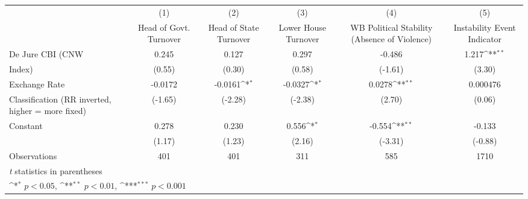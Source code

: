{
\def\sym#1{\ifmmode^{#1}\else\(^{#1}\)\fi}
\begin{tabular}{l*{5}{c}}
\hline\hline
                    &\multicolumn{1}{c}{(1)}&\multicolumn{1}{c}{(2)}&\multicolumn{1}{c}{(3)}&\multicolumn{1}{c}{(4)}&\multicolumn{1}{c}{(5)}\\
                    &\multicolumn{1}{c}{Head of Govt. Turnover}&\multicolumn{1}{c}{Head of State Turnover}&\multicolumn{1}{c}{Lower House Turnover}&\multicolumn{1}{c}{WB Political Stability (Absence of Violence)}&\multicolumn{1}{c}{Instability Event Indicator}\\
\hline
De Jure CBI (CNW    &       0.245         &       0.127         &       0.297         &      -0.486         &       1.217\sym{**} \\
Index)              &      (0.55)         &      (0.30)         &      (0.58)         &     (-1.61)         &      (3.30)         \\
[1em]
Exchange Rate       &     -0.0172         &     -0.0161\sym{*}  &     -0.0327\sym{*}  &      0.0278\sym{**} &    0.000476         \\
Classification (RR inverted, higher = more fixed)&     (-1.65)         &     (-2.28)         &     (-2.38)         &      (2.70)         &      (0.06)         \\
[1em]
Constant            &       0.278         &       0.230         &       0.556\sym{*}  &      -0.554\sym{**} &      -0.133         \\
                    &      (1.17)         &      (1.23)         &      (2.16)         &     (-3.31)         &     (-0.88)         \\
\hline
Observations        &         401         &         401         &         311         &         585         &        1710         \\
\hline\hline
\multicolumn{6}{l}{\footnotesize \textit{t} statistics in parentheses}\\
\multicolumn{6}{l}{\footnotesize \sym{*} \(p<0.05\), \sym{**} \(p<0.01\), \sym{***} \(p<0.001\)}\\
\end{tabular}
}
